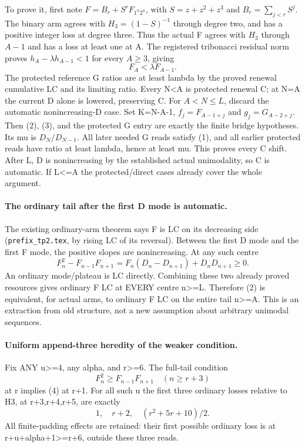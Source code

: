 To prove it, first note $F=B_r+S^rF_{1^\alpha2^u}$, with
$S=z+z^2+z^3$ and $B_r=\sum_{j<r}S^j$.
The binary arm agrees with $H_3=(1-S)^{-1}$ through degree two,
and has a positive integer loss at degree three. Thus the actual
F agrees with $H_3$ through $A-1$ and has a loss at least one
at A. The registered tribonacci residual norm proves
$h_A-\lambda h_{A-1}<1$ for every $A\ge3$, giving
\[
                         F_A<\lambda F_{A-1}.          \tag{3}
\]
The protected reference G ratios are at least lambda by the proved
renewal cumulative LC and its limiting ratio. Every N<A is protected
renewal C; at N=A the current D alone is lowered, preserving C.
For $A<N\le L$, discard the automatic nonincreasing-D case.
Set K=N-A-1, $f_j=F_{A-1+j}$ and $g_j=G_{A-2+j}$.
Then (2), (3), and the protected G entry are exactly the finite
bridge hypotheses. Its mu is $D_N/D_{N-1}$. All later needed G
reads satisfy (1), and all earlier protected reads have ratio at
least lambda, hence at least mu. This proves every C shift.
After L, D is nonincreasing by the established actual unimodality,
so C is automatic. If L<=A the protected/direct cases already
cover the whole argument.

\paragraph{The ordinary tail after the first D mode is automatic.}
The existing ordinary-arm theorem says F is LC on its decreasing
side (\texttt{prefix\_tp2.tex}, by rising LC of its reversal).
Between the first D mode and the first F mode, the positive slopes
are nonincreasing. At any such centre
\[
 F_n^2-F_{n-1}F_{n+1}
    =F_n(D_n-D_{n+1})+D_nD_{n+1}\ge0.
\]
An ordinary mode/plateau is LC directly. Combining these two
already proved resources gives ordinary F LC at EVERY centre n>=L.
Therefore (2) is equivalent, for actual arms, to ordinary F LC
on the entire tail n>=A. This is an extraction from old structure,
not a new assumption about arbitrary unimodal sequences.

\paragraph{Uniform append-three heredity of the weaker condition.}
Fix ANY u>=4, any alpha, and r>=6. The full-tail condition
\[
                  F_n^2\ge F_{n-1}F_{n+1}\quad(n\ge r+3)
                                                               \tag{4}
\]
at r implies (4) at r+1. For all such u the first three ordinary
losses relative to H3, at r+3,r+4,r+5, are exactly
\[
                   1,\quad r+2,\quad(r^2+5r+10)/2.      \tag{5}
\]
All finite-padding effects are retained: their first possible
ordinary loss is at r+u+alpha+1>=r+6, outside these three reads.

